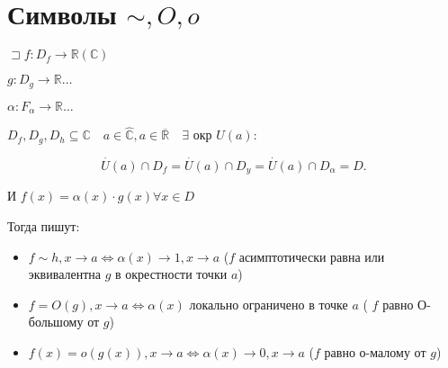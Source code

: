 \documentclass{book}
\newcommand\R{\ensuremath{\mathbb{R}}}
\renewcommand\C{\ensuremath{\mathbb{C}}}
\newcommand{\ov}[1]{\overline{#1}}
\theoremstyle{definition}
\begin{document}
\section{Символы $\sim , O, o$}

\begin{definition}
    $\sqsupset f:D_f\to \R\left( \C \right) $

    $g:D_g\to \R\ldots$

    $\alpha:F_{\alpha}\to \R\ldots$

    $D_f, D_g, D_h\subseteq \C\quad a\in \widehat{\C}, a\in \ov {\R}\quad \exists $ окр $U(a): $

     \[
         \overset{\cdot }U(a)\cap D_f = \overset{\cdot }U(a) \cap D_y = \overset{\cdot }U(a) \cap D_{\alpha} = D
    .\] 

    И  $f(x) = \alpha(x)\cdot g(x) \forall x\in D$

    Тогда пишут:
    \begin{itemize}
        \item $f\sim h, x\to a \iff  \alpha(x)\to 1, x\to a$ ($f$ асимптотически равна или эквивалентна  $g$ в окрестности точки  $a$) 
        \item $f = O(g), x\to a  \iff \alpha(x)$ локально ограничено в точке $a$ ( $f$ равно О-большому от  $g$)
        \item  $f(x) = o(g(x)), x\to a \iff  \alpha(x) \to 0, x\to a$ ($f$ равно о-малому от  $g$)
    \end{itemize}
\end{definition}
\end{document}
